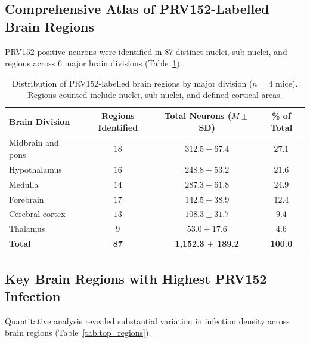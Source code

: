 \documentclass[11pt]{article}
\begin{document}
\subsection{Comprehensive Atlas of PRV152-Labelled Brain Regions}

PRV152-positive neurons were identified in 87 distinct nuclei, sub-nuclei, and regions across 6 major brain divisions (Table~\ref{tab:divisions}).

\begin{table}[H]
\centering
\caption{Distribution of PRV152-labelled brain regions by major division ($n = 4$ mice). Regions counted include nuclei, sub-nuclei, and defined cortical areas.}
\label{tab:divisions}
\begin{tabular}{lccc}
\toprule
Brain Division & Regions Identified & Total Neurons ($M \pm$ SD) & \% of Total \\
\midrule
Midbrain and pons & $18$ & $312.5 \pm 67.4$ & $27.1$ \\
Hypothalamus & $16$ & $248.8 \pm 53.2$ & $21.6$ \\
Medulla & $14$ & $287.3 \pm 61.8$ & $24.9$ \\
Forebrain & $17$ & $142.5 \pm 38.9$ & $12.4$ \\
Cerebral cortex & $13$ & $108.3 \pm 31.7$ & $9.4$ \\
Thalamus & $9$ & $53.0 \pm 17.6$ & $4.6$ \\
\midrule
\textbf{Total} & \textbf{87} & \textbf{1,152.3 $\pm$ 189.2} & \textbf{100.0} \\
\bottomrule
\end{tabular}
\end{table}

\subsection{Key Brain Regions with Highest PRV152 Infection}

Quantitative analysis revealed substantial variation in infection density across brain regions (Table~\ref{tab:top_regions}).
\end{document}
